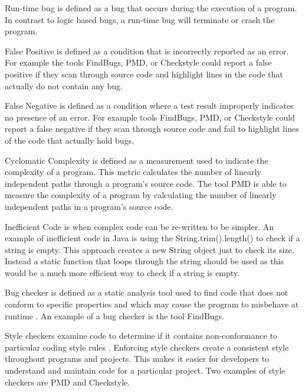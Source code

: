  Run-time bug is defined as a bug that occurs during the execution of a program. In contrast to logic based bugs, a run-time bug will terminate or crash the program. 

 False Positive is defined as a condition that is incorrectly reported as an error. For example the tools FindBugs, PMD, or Checkstyle could report a false positive if they scan through source code and highlight lines in the code that actually do not contain any bug.  
 
 False Negative is defined as a condition where a test result improperly indicates no presence of an error. For example tools FindBugs, PMD, or Checkstyle could report a false negative if they scan through source code and fail to highlight lines of the code that actually hold bugs. 
 
 Cyclomatic Complexity is defined as a measurement used to indicate the complexity of a program. This  metric calculates the number of linearly independent paths through a program's source code. The tool PMD is able to measure the complexity of a program by calculating the number of linearly independent paths in a program's source code.

 Inefficient Code is when complex code can be re-written to be simpler. An example of inefficient code in Java is using the String.trim().length() to check if a string is empty. This approach creates a new String object just to check its size. Instead a static function that loops through the string should be used as this would be a much more efficient way to check if a string is empty. 
 
 Bug checker is defined as a static analysis tool used to find code that does not conform to specific properties and which may cause the program to misbehave at runtime \cite{bugFindingTools}. An example of a bug checker is the tool FindBugs.
 
 Style checkers examine code to determine if it contains non-conformance to particular coding style rules \cite{bugFindingTools}. Enforcing style checkers create a consistent style throughout  programs and projects. This makes it easier for developers to understand and maintain code for a particular project. Two examples of style checkers are PMD and Checkstyle.





